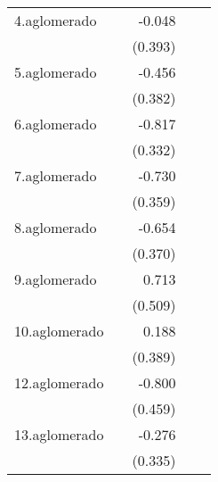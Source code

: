 {\begin{longtable}{l*{4}{D{.}{.}{-1}}}
\addlinespace
4.aglomerado&                     &      -0.048         &                     &                     \\
            &                     &     (0.393)         &                     &                     \\
\addlinespace
5.aglomerado&                     &      -0.456         &                     &                     \\
            &                     &     (0.382)         &                     &                     \\
\addlinespace
6.aglomerado&                     &      -0.817\sym{*}  &                     &                     \\
            &                     &     (0.332)         &                     &                     \\
\addlinespace
7.aglomerado&                     &      -0.730\sym{*}  &                     &                     \\
            &                     &     (0.359)         &                     &                     \\
\addlinespace
8.aglomerado&                     &      -0.654         &                     &                     \\
            &                     &     (0.370)         &                     &                     \\
\addlinespace
9.aglomerado&                     &       0.713         &                     &                     \\
            &                     &     (0.509)         &                     &                     \\
\addlinespace
10.aglomerado&                     &       0.188         &                     &                     \\
            &                     &     (0.389)         &                     &                     \\
\addlinespace
12.aglomerado&                     &      -0.800         &                     &                     \\
            &                     &     (0.459)         &                     &                     \\
\addlinespace
13.aglomerado&                     &      -0.276         &                     &                     \\
            &                     &     (0.335)         &                     &                     \\

\end{longtable}}

